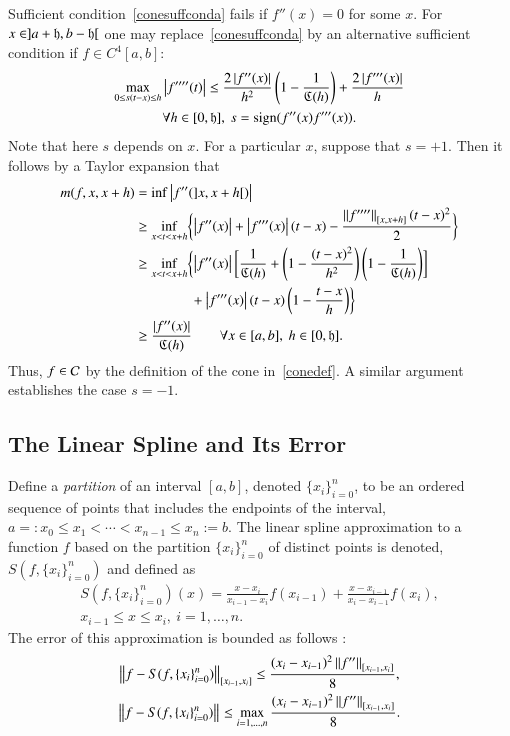 \documentclass[review]{elsarticle}
\newcommand{\datasites}{\{x_i\}_{i=0}^n}
\theoremstyle{definition}
\begin{document}
Sufficient condition~\eqref{conesuffconda} fails if $f''(x) = 0$ for some $x$.  For $x \in ]a + \fh, b-\fh[$ one may replace~\eqref{conesuffconda} by an alternative sufficient condition if  $f \in C^4[a,b]$:
\begin{multline} \label{conesuffcondb}
\max_{0 \le s(t-x) \le h }{\abs{f''''(t)}} \le \frac{2\abs{f''(x)}}{h^2} \left( 1 - \frac{1}{\fC(h)} \right) +  \frac{2\abs{f'''(x)}}{h}  \\ \forall  h \in [0,\fh], \ s = \sign(f''(x)f'''(x)).
\end{multline}
Note that here $s$ depends on $x$.  For a particular $x$, suppose that $s = +1$.  Then it follows by a Taylor expansion that
\begin{align*}
m(f,x,x+h) & = \inf \abs{f''(]x,x+h[)} \\
& \ge \inf_{x < t < x+h} \biggl\{ \abs{f''(x)} + \abs{f'''(x)}(t-x)  - \frac{\norm[{[x,x+h]}]{f''''}(t-x)^2}{2} \biggr\}\\
& \ge \inf_{x < t < x+h} \biggl\{ \abs{f''(x)} \biggl[ \frac{1}{\fC(h)} + \left(1 - \frac{(t-x)^2}{h^2}\right)\left(1 - \frac{1}{\fC(h)}\right) \biggr] \\
& \qquad \qquad + \abs{f'''(x)}(t-x)\left(1 -  \frac{t-x}{h}\right)  \biggr\}\\
& \ge  \frac{\abs{f''(x)}}{\fC(h)} \qquad \forall x \in [a,b],\ h \in [0,\fh].
\end{align*}
Thus, $f \in \cc$ by the definition of the cone in~\eqref{conedef}.  A similar argument establishes the case $s = -1$.

\subsection{The Linear Spline and Its Error} \label{subsec:spline}

Define a \emph{partition} of an interval $[a, b]$, denoted $\datasites$, to be
an ordered sequence of points that includes the endpoints of the interval,
$a=:x_0 \le x_1 < \cdots < x_{n-1} \le x_{n}:=b$.  The linear spline
approximation to a function $f$ based on the partition $\datasites$ of distinct points is denoted,
$S(f,\datasites)$ and defined as
\begin{multline} \label{splinedef}
S(f,\datasites)(x) =  \frac{x-x_i}{x_{i-1} - x_i} f(x_{i-1}) + \frac{x-x_{i-1}}{x_{i} - x_{i-1}}f(x_i), \\ x_{i-1} \le x \le x_i, \ i=1, \ldots, n.
\end{multline}
The error of this approximation is bounded as follows \cite[Theorem 3.3]{BurFaiBur16a}:
\begin{subequations} \label{appxerrbda}
\begin{gather}
\label{appxerrbdapc}
\norm[{[x_{i-1},x_i]}]{f - S(f,\datasites)} \le \frac{(x_i - x_{i-1})^2\norm[{[x_{i-1},x_i]}]{f''}}{8}, \\
\norm{f - S(f,\datasites)} \le \max_{i=1, \ldots, n} \frac{(x_i - x_{i-1})^2\norm[{[x_{i-1},x_i]}]{f''}}{8}.
\end{gather}
\end{subequations}
\end{document}
